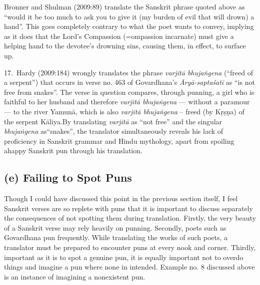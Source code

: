 Bronner and Shulman (2009:89) translate the Sanskrit phrase quoted above as “would it be too much to ask you to give it (my burden of evil that will drown) a hand”. This goes completely contrary to what the poet wants to convey, implying as it does that the Lord’s Compassion (=ompassion incarnate) must give a helping hand to the devotee’s drowning sins, causing them, in effect, to surface up. 

17.~Hardy (2009:184) wrongly translates the phrase \textsl{varjitā bhujaṅgena} (“freed of a serpent”) that occurs in verse no. 463 of Govardhana’s \textsl{Āryā-saptaśatī} as “is not free from snakes”. The verse in question compares, through punning, a girl who is faithful to her husband and therefore \textsl{varjitā bhujaṅgena} --- without a paramour --- to the river Yamunā, which is also \textsl{varjitā bhujaṅgena } --  freed (by Kṛṣṇa) of the serpent Kāliya.\break By translating \textsl{varjitā} as “not free” and the singular \textsl{bhujaṅgena} as\break “snakes”, the translator simultaneously reveals his lack of proficiency in Sanskrit grammar and Hindu mythology, apart from spoiling a\break happy Sanskrit pun through his translation.\\[-21pt]

\subsection*{(e) Failing to Spot Puns}

Though I could have discussed this point in the previous section itself, I feel Sanskrit verses are so replete with puns that it is important to discuss separately the consequences of not spotting them during translation. Firstly, the very beauty of a Sanskrit verse may rely heavily on punning. Secondly, poets such as Govardhana pun frequently. While translating the works of such poets, a translator must be prepared to encounter puns at every nook and corner. Thirdly, important as it is to spot a genuine pun, it is equally important not to overdo things and imagine a pun where none in intended. Example no. 8 discussed above is an instance of imagining a nonexistent pun. 

